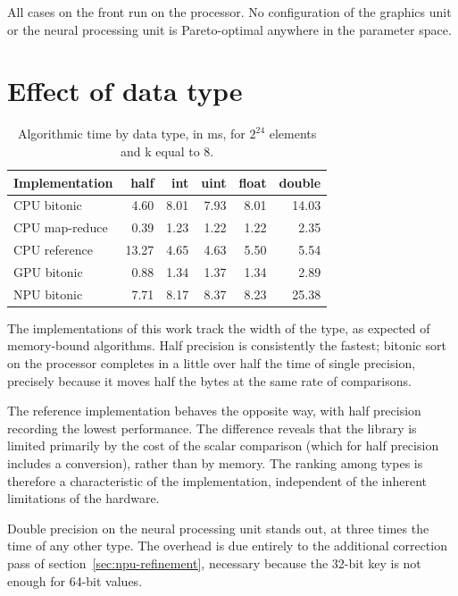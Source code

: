 All cases on the front run on the processor. No configuration of the graphics
unit or the neural processing unit is Pareto-optimal anywhere in the parameter
space.

\section{Effect of data type}
\label{sec:eval-dtypes}

\begin{table}[H]
    \centering
    \begin{tabular}{lrrrrr}
        \toprule
        Implementation & half & int & uint & float & double \\
        \midrule
        CPU bitonic & 4.60 & 8.01 & 7.93 & 8.01 & 14.03 \\
        CPU map-reduce & 0.39 & 1.23 & 1.22 & 1.22 & 2.35 \\
        CPU reference & 13.27 & 4.65 & 4.63 & 5.50 & 5.54 \\
        GPU bitonic & 0.88 & 1.34 & 1.37 & 1.34 & 2.89 \\
        NPU bitonic & 7.71 & 8.17 & 8.37 & 8.23 & 25.38 \\
        \bottomrule
    \end{tabular}
    \caption[Algorithmic time by data type]{Algorithmic time by data type, in
    ms, for $2^{24}$ elements and k equal to 8.}
    \label{tab:eval-dtypes}
\end{table}

The implementations of this work track the width of the type, as expected of
memory-bound algorithms. Half precision is consistently the fastest; bitonic
sort on the processor completes in a little over half the time of single
precision, precisely because it moves half the bytes at the same rate of
comparisons.

The reference implementation behaves the opposite way, with half precision
recording the lowest performance. The difference reveals that the library is
limited primarily by the cost of the scalar comparison (which for half
precision includes a conversion), rather than by memory. The ranking among
types is therefore a characteristic of the implementation, independent of the
inherent limitations of the hardware.

Double precision on the neural processing unit stands out, at three times the
time of any other type. The overhead is due entirely to the additional
correction pass of section~\ref{sec:npu-refinement}, necessary because the
32-bit key is not enough for 64-bit values.

